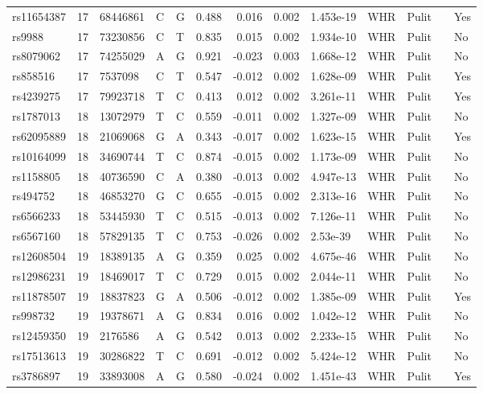\documentclass[11pt,twoside]{bristolthesis}
\begin{document}
\begin{longtable}[t]{lrlllrrrlllll}
rs11654387 & 17 & 68446861 & C & G & 0.488 & 0.016 & 0.002 & 1.453e-19 & WHR & Pulit &  & Yes\\
rs9988 & 17 & 73230856 & C & T & 0.835 & 0.015 & 0.002 & 1.934e-10 & WHR & Pulit &  & No\\
rs8079062 & 17 & 74255029 & A & G & 0.921 & -0.023 & 0.003 & 1.668e-12 & WHR & Pulit &  & No\\
rs858516 & 17 & 7537098 & C & T & 0.547 & -0.012 & 0.002 & 1.628e-09 & WHR & Pulit &  & Yes\\
rs4239275 & 17 & 79923718 & T & C & 0.413 & 0.012 & 0.002 & 3.261e-11 & WHR & Pulit &  & Yes\\
\addlinespace
rs1787013 & 18 & 13072979 & T & C & 0.559 & -0.011 & 0.002 & 1.327e-09 & WHR & Pulit &  & No\\
rs62095889 & 18 & 21069068 & G & A & 0.343 & -0.017 & 0.002 & 1.623e-15 & WHR & Pulit &  & Yes\\
rs10164099 & 18 & 34690744 & T & C & 0.874 & -0.015 & 0.002 & 1.173e-09 & WHR & Pulit &  & No\\
rs1158805 & 18 & 40736590 & C & A & 0.380 & -0.013 & 0.002 & 4.947e-13 & WHR & Pulit &  & No\\
rs494752 & 18 & 46853270 & G & C & 0.655 & -0.015 & 0.002 & 2.313e-16 & WHR & Pulit &  & No\\
\addlinespace
rs6566233 & 18 & 53445930 & T & C & 0.515 & -0.013 & 0.002 & 7.126e-11 & WHR & Pulit &  & No\\
rs6567160 & 18 & 57829135 & T & C & 0.753 & -0.026 & 0.002 & 2.53e-39 & WHR & Pulit &  & No\\
rs12608504 & 19 & 18389135 & A & G & 0.359 & 0.025 & 0.002 & 4.675e-46 & WHR & Pulit &  & No\\
rs12986231 & 19 & 18469017 & T & C & 0.729 & 0.015 & 0.002 & 2.044e-11 & WHR & Pulit &  & No\\
rs11878507 & 19 & 18837823 & G & A & 0.506 & -0.012 & 0.002 & 1.385e-09 & WHR & Pulit &  & Yes\\
\addlinespace
rs998732 & 19 & 19378671 & A & G & 0.834 & 0.016 & 0.002 & 1.042e-12 & WHR & Pulit &  & No\\
rs12459350 & 19 & 2176586 & A & G & 0.542 & 0.013 & 0.002 & 2.233e-15 & WHR & Pulit &  & No\\
rs17513613 & 19 & 30286822 & T & C & 0.691 & -0.012 & 0.002 & 5.424e-12 & WHR & Pulit &  & No\\
rs3786897 & 19 & 33893008 & A & G & 0.580 & -0.024 & 0.002 & 1.451e-43 & WHR & Pulit &  & Yes\\

\end{longtable}
\end{document}
